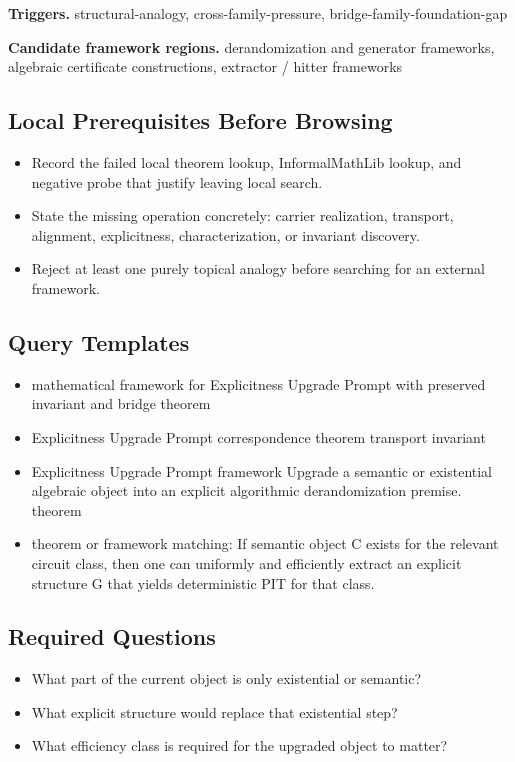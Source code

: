 \documentclass[11pt]{article}
\begin{document}
\textbf{Triggers.} structural-analogy, cross-family-pressure, bridge-family-foundation-gap

\textbf{Candidate framework regions.} derandomization and generator frameworks, algebraic certificate constructions, extractor / hitter frameworks

\subsection*{Local Prerequisites Before Browsing}
\begin{itemize}[leftmargin=*,itemsep=0.2em]
\item Record the failed local theorem lookup, InformalMathLib lookup, and negative probe that justify leaving local search.
\item State the missing operation concretely: carrier realization, transport, alignment, explicitness, characterization, or invariant discovery.
\item Reject at least one purely topical analogy before searching for an external framework.
\end{itemize}
\subsection*{Query Templates}
\begin{itemize}[leftmargin=*,itemsep=0.2em]
\item mathematical framework for Explicitness Upgrade Prompt with preserved invariant and bridge theorem
\item Explicitness Upgrade Prompt correspondence theorem transport invariant
\item Explicitness Upgrade Prompt framework Upgrade a semantic or existential algebraic object into an explicit algorithmic derandomization premise. theorem
\item theorem or framework matching: If semantic object C exists for the relevant circuit class, then one can uniformly and efficiently extract an explicit structure G that yields deterministic PIT for that class.
\end{itemize}
\subsection*{Required Questions}
\begin{itemize}[leftmargin=*,itemsep=0.2em]
\item What part of the current object is only existential or semantic?
\item What explicit structure would replace that existential step?
\item What efficiency class is required for the upgraded object to matter?
\end{itemize}
\end{document}

